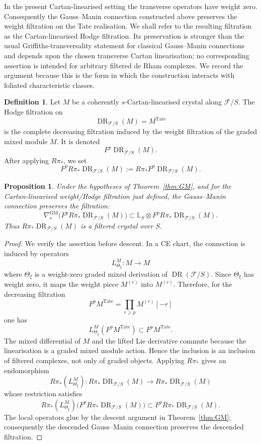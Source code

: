 \documentclass[11pt,reqno,a4paper,dvipsnames,x11names]{amsart}
\numberwithin{equation}{section}
\theoremstyle{plain}
\newtheorem{proposition}[theorem]{Proposition}
\theoremstyle{definition}
\newtheorem{definition}[theorem]{Definition}
\theoremstyle{remark}
\DeclareMathOperator{\DR}{DR}
\newcommand{\cF}{\mathcal F}
\newcommand{\bbL}{\mathbb L}
\newcommand{\from}{\colon}
\newcommand{\Tate}{\mathrm{Tate}}
\newcommand{\GM}{\mathrm{GM}}
\begin{document}
In the present Cartan-linearised setting the transverse operators have weight zero. Consequently the Gauss--Manin connection constructed above preserves the weight filtration on the Tate realisation. We shall refer to the resulting filtration as the Cartan-linearised Hodge filtration. Its preservation is stronger than the usual Griffiths-transversality statement for classical Gauss--Manin connections and depends upon the chosen transverse Cartan linearisation; no corresponding assertion is intended for arbitrary filtered de Rham complexes. We record the argument because this is the form in which the construction interacts with foliated characteristic classes.

\begin{definition}
Let \(M\) be a coherently \(s\)-Cartan-linearised crystal along \(\cF/S\). The Hodge filtration on
\[
 \DR_{\cF/S}(M)=M^{\Tate}
\]
is the complete decreasing filtration induced by the weight filtration of the graded mixed module \(M\). It is denoted
\[
 F^p\DR_{\cF/S}(M).
\]
After applying \(R\pi_*\), we set
\[
 F^pR\pi_*\DR_{\cF/S}(M):=R\pi_*F^p\DR_{\cF/S}(M).
\]
\end{definition}

\begin{proposition}\label{prop:filtered-GM}
Under the hypotheses of Theorem~\ref{thm:GM}, and for the Cartan-linearised weight/Hodge filtration just defined, the Gauss--Manin connection preserves the filtration:
\[
 \nabla^{\GM}_s
 \bigl(F^pR\pi_*\DR_{\cF/S}(M)\bigr)
 \subset
 \bbL_S\otimes F^pR\pi_*\DR_{\cF/S}(M).
\]
Thus \(R\pi_*\DR_{\cF/S}(M)\) is a filtered crystal over \(S\).
\end{proposition}

\begin{proof}
We verify the assertion before descent. In a CE chart, the connection is induced by operators
\[
 L^M_{\Theta_\xi}\from M\to M
\]
where \(\Theta_\xi\) is a weight-zero graded mixed derivation of \(\DR(\cF/S)\). Since \(\Theta_\xi\) has weight zero, it maps the weight piece \(M^{(r)}\) into \(M^{(r)}\). Therefore, for the decreasing filtration
\[
 F^pM^{\Tate}=\prod_{r\ge p}M^{(r)}[-r]
\]
one has
\[
 L^M_{\Theta_\xi}(F^pM^{\Tate})\subset F^pM^{\Tate}.
\]
The mixed differential of \(M\) and the lifted Lie derivative commute because the linearisation is a graded mixed module action. Hence the inclusion is an inclusion of filtered complexes, not only of graded objects. Applying \(R\pi_*\) gives an endomorphism
\[
 R\pi_*(L^M_{\Theta_\xi})
 \from R\pi_*\DR_{\cF/S}(M)
 \longrightarrow R\pi_*\DR_{\cF/S}(M)
\]
whose restriction satisfies
\[
 R\pi_*(L^M_{\Theta_\xi})
 \bigl(F^pR\pi_*\DR_{\cF/S}(M)\bigr)
 \subset F^pR\pi_*\DR_{\cF/S}(M).
\]
The local operators glue by the descent argument in Theorem~\ref{thm:GM}; consequently the descended Gauss--Manin connection preserves the descended filtration.
\end{proof}
\end{document}
